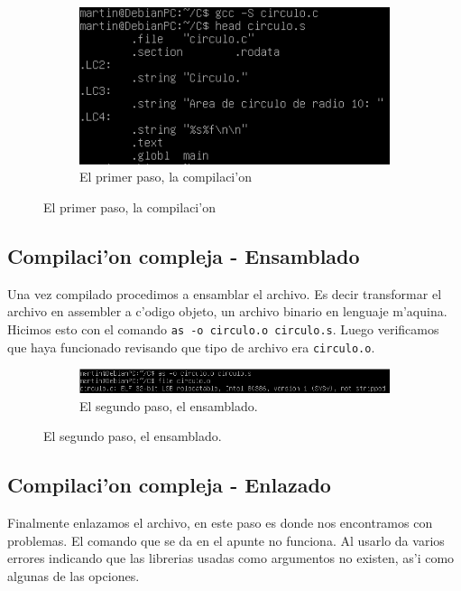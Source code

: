 \documentclass[11pt]{article}
\begin{document}
		\begin{figure}[H]
			\centering
			\begin{subfigure}[b!]{0.7\linewidth}
				\includegraphics[width=\linewidth]{Images/Seccion 1/S1 parte tres.PNG}
				\caption*{El primer paso, la compilaci'on}
			\end{subfigure}
		\end{figure}
		
	\subsection{Compilaci'on compleja - Ensamblado}
		Una vez compilado procedimos a ensamblar el archivo. Es decir transformar el archivo en assembler a c'odigo objeto, un archivo binario en lenguaje m'aquina. Hicimos esto con el comando \texttt{as -o circulo.o circulo.s}. Luego verificamos que haya funcionado revisando que tipo de archivo era \texttt{circulo.o}.
		\begin{figure}[H]
			\centering
			\begin{subfigure}[b!]{0.7\linewidth}
				\includegraphics[width=\linewidth]{Images/Seccion 1/S1 parte cuatro.PNG}
				\caption*{El segundo paso, el ensamblado.}
			\end{subfigure}
		\end{figure}
		
	\subsection{Compilaci'on compleja - Enlazado}
		Finalmente enlazamos el archivo, en este paso es donde nos encontramos con problemas. El comando que se da en el apunte no funciona. Al usarlo da varios errores indicando que las librerias usadas como argumentos no existen, as'i como algunas de las opciones.
	
\end{document}
